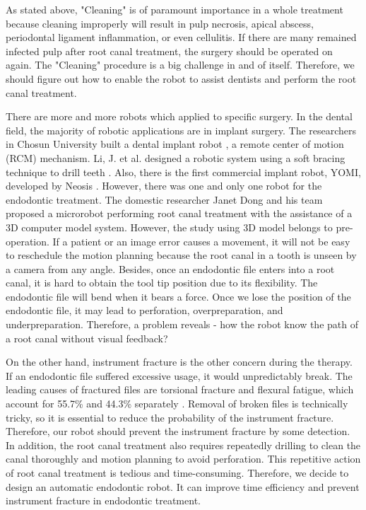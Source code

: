 \par
As stated above, "Cleaning" is of paramount importance in a whole treatment because cleaning improperly will result in pulp necrosis, apical abscess, periodontal ligament inflammation, or even cellulitis. If there are many remained infected pulp after root canal treatment, the surgery should be operated on again. The "Cleaning" procedure is a big challenge in and of itself. Therefore, we should figure out how to enable the robot to assist dentists and perform the root canal treatment.
\par
There are more and more robots which applied to specific surgery. In the dental field, the majority of robotic applications are in implant surgery. The researchers in Chosun University built a dental implant robot \cite{Kim2009ASO}, a remote center of motion (RCM) mechanism. Li, J. et al. designed a robotic system using a soft bracing technique to drill teeth \cite{Li2019ACD}. Also, there is the first commercial implant robot, YOMI, developed by Neosis \cite{web3}. However, there was one and only one robot for the endodontic treatment. The domestic researcher Janet Dong and his team proposed a microrobot performing root canal treatment with the assistance of a 3D computer model system. However, the study using 3D model belongs to pre-operation. If a patient or an image error causes a movement, it will not be easy to reschedule the motion planning because the root canal in a tooth is unseen by a camera from any angle. Besides, once an endodontic file enters into a root canal, it is hard to obtain the tool tip position due to its flexibility. The endodontic file will bend when it bears a force. Once we lose the position of the endodontic file, it may lead to perforation, overpreparation, and underpreparation. Therefore, a problem reveals - how the robot know the path of a root canal without visual feedback? 
\par
On the other hand, instrument fracture is the other concern during the therapy. If an endodontic file suffered excessive usage, it would unpredictably break. The leading causes of fractured files are torsional fracture and flexural fatigue, which account for 55.7\% and 44.3\% separately \cite{SATTAPAN2000161}. Removal of broken files is technically tricky, so it is essential to reduce the probability of the instrument fracture. Therefore, our robot should prevent the instrument fracture by some detection. In addition, the root canal treatment also requires repeatedly drilling to clean the canal thoroughly and motion planning to avoid perforation. This repetitive action of root canal treatment is tedious and time-consuming. Therefore, we decide to design an automatic endodontic robot. It can improve time efficiency and prevent instrument fracture in endodontic treatment.	
